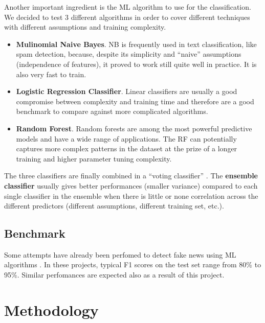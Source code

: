 \documentclass[a4paper,12pt]{article} %
\begin{document}
Another important ingredient is the ML algorithm to use for the classification.
We decided to test 3 different algorithms in order to cover different techniques with different assumptions
and training complexity.
\begin{itemize}
\item \textbf{Mulinomial Naive Bayes}. NB is frequently used in text classification,
like spam detection, because, despite its simplicity and ``naive'' assumptions (independence of features),
it proved to work still quite well in practice. It is also very fast to train.
\item \textbf{Logistic Regression Classifier}. Linear classifiers are usually a good compromise between
complexity and training time and therefore are a good benchmark to compare against more complicated algorithms.
\item \textbf{Random Forest}. Random forests are among the most powerful predictive
models and have a wide range of applications. The RF can potentially captures
more complex patterns in the dataset at the prize of a longer training and higher
parameter tuning complexity.
\end{itemize}
The three classifiers are finally combined in a ``voting classifier'' \cite{scikit-ensemble}.
The \textbf{ensemble classifier} usually gives better performances (smaller variance) compared to each single classifier in the
ensemble when there is little or none correlation across the different predictors
(different assumptions, different training set, etc.).

\subsection{Benchmark}
\label{sec:benchmark}
Some attempts have already been perfomed to detect fake news using ML algorithms \cite{Genes, NYDSA, jarmul}.
In these projects, typical F1 scores on the test set range from 80\% to 95\%.
Similar perfomances are expected also as a result of this project.


\section{Methodology}
\end{document}

